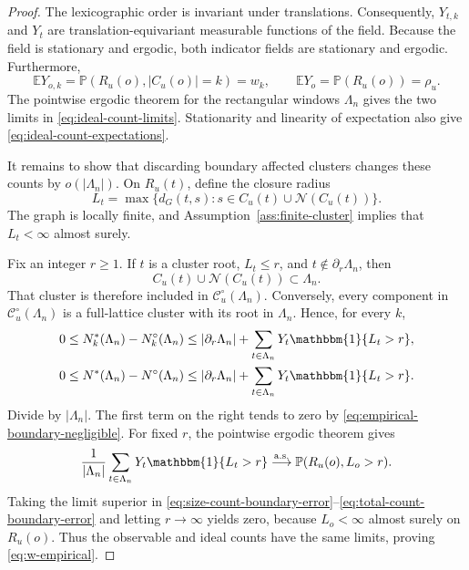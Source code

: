 \documentclass[aap,preprint]{imsart}
\theoremstyle{plain}
\theoremstyle{definition}
\def\E{{\mathbb E}}
\def\P{{\mathbb P}}
\begin{document}
	\begin{proof}
		The lexicographic order is invariant under translations. Consequently,
		$Y_{t,k}$ and $Y_t$ are translation-equivariant measurable functions of the
		field. Because the field is stationary and ergodic, both indicator fields are
		stationary and ergodic. Furthermore,
		\[
		\E Y_{o,k}
		=\P(R_u(o),|C_u(o)|=k)=w_k,
		\qquad
		\E Y_o=\P(R_u(o))=\rho_u.
		\]
		The pointwise ergodic theorem for the rectangular windows $\Lambda_n$ gives
		the two limits in \eqref{eq:ideal-count-limits}. Stationarity and linearity of
		expectation also give \eqref{eq:ideal-count-expectations}.
		
		It remains to show that discarding boundary affected clusters changes these
		counts by $o(|\Lambda_n|)$. On $R_u(t)$, define the closure radius
		\begin{equation}\label{eq:cluster-closure-radius}
			L_t
			=\max\{d_G(t,s):s\in C_u(t)\cup\mathcal N(C_u(t))\}.
		\end{equation}
		The graph is locally finite, and
		Assumption~\ref{ass:finite-cluster} implies that $L_t<\infty$ almost surely.
		
		Fix an integer $r\geq1$. If $t$ is a cluster root, $L_t\leq r$, and
		$t\notin\partial_r\Lambda_n$, then
		\[
		C_u(t)\cup\mathcal N(C_u(t))\subset\Lambda_n.
		\]
		That cluster is therefore included in
		$ \mathscr C_u^\circ(\Lambda_n)$. Conversely, every component in
		$ \mathscr C_u^\circ(\Lambda_n)$ is a full-lattice cluster with its root in
		$\Lambda_n$. Hence, for every $k$,
		\begin{align}
			0&\leq N_k^*(\Lambda_n)-N_k^\circ(\Lambda_n)
			\leq |\partial_r\Lambda_n|
			+\sum_{t\in\Lambda_n}Y_t\mathbbm{1}\{L_t>r\},
			\label{eq:size-count-boundary-error}\\
			0&\leq N^*(\Lambda_n)-N^\circ(\Lambda_n)
			\leq |\partial_r\Lambda_n|
			+\sum_{t\in\Lambda_n}Y_t\mathbbm{1}\{L_t>r\}.
			\label{eq:total-count-boundary-error}
		\end{align}
		Divide by $|\Lambda_n|$. The first term on the right tends to zero by
		\eqref{eq:empirical-boundary-negligible}. For fixed $r$, the pointwise
		ergodic theorem gives
		\[
		\frac1{|\Lambda_n|}\sum_{t\in\Lambda_n}
		Y_t\mathbbm{1}\{L_t>r\}
		\overset{\rm a.s.}{\longrightarrow}
		\P(R_u(o),L_o>r).
		\]
		Taking the limit superior in
		\eqref{eq:size-count-boundary-error}--\eqref{eq:total-count-boundary-error}
		and letting $r\to\infty$ yields zero, because $L_o<\infty$ almost surely
		on $R_u(o)$. Thus the observable and ideal counts have the same 
		limits, proving \eqref{eq:w-empirical}.
		

\end{proof}
\end{document}
